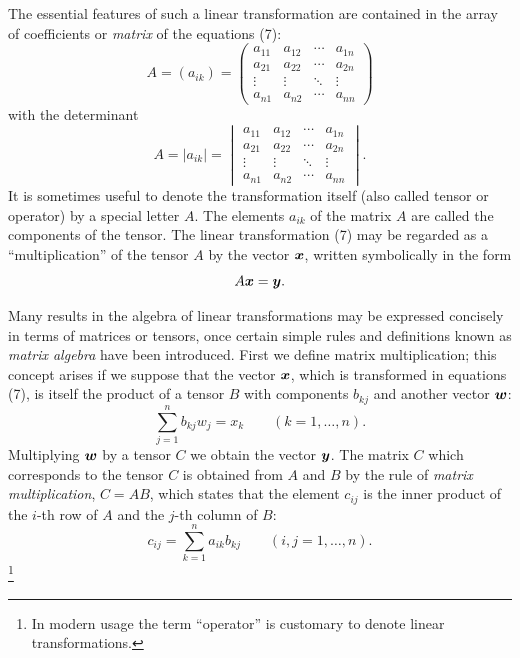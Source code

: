 The essential features of such a linear transformation are contained in the array of coefficients or \emph{matrix} of the equations (7):
\begin{equation*}
A=(a_{ik})=
\begin{pmatrix}
a_{11}&a_{12}&\cdots&a_{1n}\\
a_{21}&a_{22}&\cdots&a_{2n}\\
\vdots&\vdots&\ddots&\vdots\\
a_{n1}&a_{n2}&\cdots&a_{nn}
\end{pmatrix}
\tag{9}
\end{equation*}
with the determinant
\[
A=|a_{ik}|=
\begin{vmatrix}
a_{11}&a_{12}&\cdots&a_{1n}\\
a_{21}&a_{22}&\cdots&a_{2n}\\
\vdots&\vdots&\ddots&\vdots\\
a_{n1}&a_{n2}&\cdots&a_{nn}
\end{vmatrix}.
\]
It is sometimes useful to denote the transformation itself (also called tensor or operator) by a special letter $A$. The elements $a_{ik}$ of the matrix $A$ are called the components of the tensor. The linear transformation (7) may be regarded as a ``multiplication'' of the tensor $A$ by the vector $\bm{x}$, written symbolically in the form
\[
A\bm{x}=\bm{y}.
\]

Many results in the algebra of linear transformations may be expressed concisely in terms of matrices or tensors, once certain simple rules and definitions known as \emph{matrix algebra} have been introduced. First we define matrix multiplication; this concept arises if we suppose that the vector $\bm{x}$, which is transformed in equations (7), is itself the product of a tensor $B$ with components $b_{kj}$ and another vector $\bm{w}$:
\[
\sum_{j=1}^{n}b_{kj}w_j=x_k\qquad(k=1,\ldots,n).
\]
Multiplying $\bm{w}$ by a tensor $C$ we obtain the vector $\bm{y}$. The matrix $C$ which corresponds to the tensor $C$ is obtained from $A$ and $B$ by the rule of \emph{matrix multiplication}, $C=AB$, which states that the element $c_{ij}$ is the inner product of the $i$-th row of $A$ and the $j$-th column of $B$:
\begin{equation*}
c_{ij}=\sum_{k=1}^{n}a_{ik}b_{kj}\qquad(i,j=1,\ldots,n).
\tag{10}
\end{equation*}
\footnote{In modern usage the term ``operator'' is customary to denote linear transformations.}

